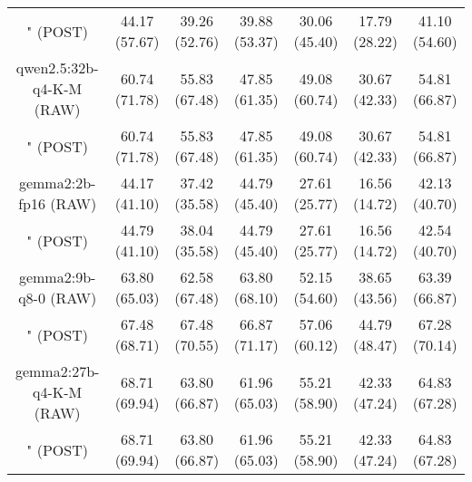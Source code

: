 \begin{table}[]
{\begin{tabular}{ccccccc}
        

        \multicolumn{1}{c|}{" (POST)} & 44.17 (57.67) & 39.26 (52.76) & \multicolumn{1}{c|}{39.88 (53.37)} & 30.06 (45.40) & \multicolumn{1}{c|}{17.79 (28.22)} & 41.10 (54.60) \\
        \cline{1-7}
        

        \multicolumn{1}{c|}{qwen2.5:32b-q4-K-M (RAW)} & 60.74 (71.78) & 55.83 (67.48) & \multicolumn{1}{c|}{47.85 (61.35)} & 49.08 (60.74) & \multicolumn{1}{c|}{30.67 (42.33)} & 54.81 (66.87) \\
        
        

        \multicolumn{1}{c|}{" (POST)} & 60.74 (71.78) & 55.83 (67.48) & \multicolumn{1}{c|}{47.85 (61.35)} & 49.08 (60.74) & \multicolumn{1}{c|}{30.67 (42.33)} & 54.81 (66.87) \\
        \cline{1-7}
        

        \multicolumn{1}{c|}{gemma2:2b-fp16 (RAW)} & 44.17 (41.10) & 37.42 (35.58) & \multicolumn{1}{c|}{44.79 (45.40)} & 27.61 (25.77) & \multicolumn{1}{c|}{16.56 (14.72)} & 42.13 (40.70) \\
        
        

        \multicolumn{1}{c|}{" (POST)} & 44.79 (41.10) & 38.04 (35.58) & \multicolumn{1}{c|}{44.79 (45.40)} & 27.61 (25.77) & \multicolumn{1}{c|}{16.56 (14.72)} & 42.54 (40.70) \\
        \cline{1-7}
        

        \multicolumn{1}{c|}{gemma2:9b-q8-0 (RAW)} & 63.80 (65.03) & 62.58 (67.48) & \multicolumn{1}{c|}{63.80 (68.10)} & 52.15 (54.60) & \multicolumn{1}{c|}{38.65 (43.56)} & 63.39 (66.87) \\
        
        

        \multicolumn{1}{c|}{" (POST)} & 67.48 (68.71) & 67.48 (70.55) & \multicolumn{1}{c|}{66.87 (71.17)} & 57.06 (60.12) & \multicolumn{1}{c|}{44.79 (48.47)} & 67.28 (70.14) \\
        \cline{1-7}
        

        \multicolumn{1}{c|}{gemma2:27b-q4-K-M (RAW)} & 68.71 (69.94) & 63.80 (66.87) & \multicolumn{1}{c|}{61.96 (65.03)} & 55.21 (58.90) & \multicolumn{1}{c|}{42.33 (47.24)} & 64.83 (67.28) \\
        
        

        \multicolumn{1}{c|}{" (POST)} & 68.71 (69.94) & 63.80 (66.87) & \multicolumn{1}{c|}{61.96 (65.03)} & 55.21 (58.90) & \multicolumn{1}{c|}{42.33 (47.24)} & 64.83 (67.28) \\
        \cline{1-7}
        


\end{tabular}}
\end{table}
